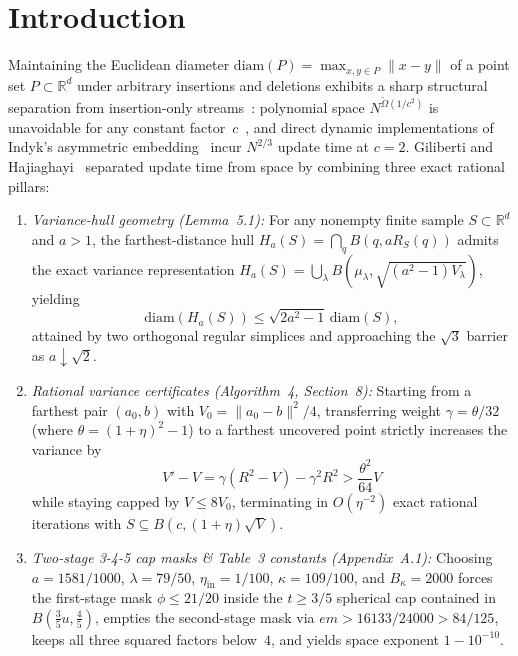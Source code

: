 \documentclass[11pt,twocolumn]{article}
\newcommand{\RR}{\mathbb{R}}
\begin{document}
\section{Introduction}
Maintaining the Euclidean diameter $\mathrm{diam}(P) = \max_{x,y \in P}\|x-y\|$ of a point set $P \subset \RR^d$ under arbitrary insertions and deletions exhibits a sharp structural separation from insertion-only streams~\cite{agarwal2015streaming}: polynomial space $N^{\tilde{\Omega}(1/c^2)}$ is unavoidable for any constant factor~$c$~\cite{khanna2025polynomial,padaki2026near}, and direct dynamic implementations of Indyk's asymmetric embedding~\cite{indyk2003better} incur $N^{2/3}$ update time at $c=2$. Giliberti and Hajiaghayi~\cite{giliberti2026diameter} separated update time from space by combining three exact rational pillars:
\begin{enumerate}[leftmargin=*,nosep]
  \item \emph{Variance-hull geometry (Lemma~5.1):} For any nonempty finite sample $S \subset \RR^d$ and $a > 1$, the farthest-distance hull $H_a(S) = \bigcap_q B(q, a R_S(q))$ admits the exact variance representation $H_a(S) = \bigcup_\lambda B(\mu_\lambda, \sqrt{(a^2-1)V_\lambda})$, yielding
  \begin{equation}
    \mathrm{diam}(H_a(S)) \le \sqrt{2a^2 - 1}\,\mathrm{diam}(S),
    \label{eq:hull}
  \end{equation}
  attained by two orthogonal regular simplices and approaching the $\sqrt{3}$ barrier as $a \downarrow \sqrt{2}$.
  \item \emph{Rational variance certificates (Algorithm~4, Section~8):} Starting from a farthest pair $(a_0, b)$ with $V_0 = \|a_0-b\|^2/4$, transferring weight $\gamma = \theta/32$ (where $\theta = (1+\eta)^2-1$) to a farthest uncovered point strictly increases the variance by
  \begin{equation}
    V' - V = \gamma(R^2 - V) - \gamma^2 R^2 > \frac{\theta^2}{64} V
    \label{eq:alg4}
  \end{equation}
  while staying capped by $V \le 8 V_0$, terminating in $O(\eta^{-2})$ exact rational iterations with $S \subseteq B(c, (1+\eta)\sqrt{V})$.
  \item \emph{Two-stage 3-4-5 cap masks \& Table~3 constants (Appendix~A.1):} Choosing $a = 1581/1000$, $\lambda = 79/50$, $\eta_{\mathrm{in}} = 1/100$, $\kappa = 109/100$, and $B_\kappa = 2000$ forces the first-stage mask $\phi \le 21/20$ inside the $t \ge 3/5$ spherical cap contained in $B(\frac{3}{5}u, \frac{4}{5})$, empties the second-stage mask via $e m > 16133/24000 > 84/125$, keeps all three squared factors below~$4$, and yields space exponent $1 - 10^{-10}$.
\end{enumerate}
\end{document}

